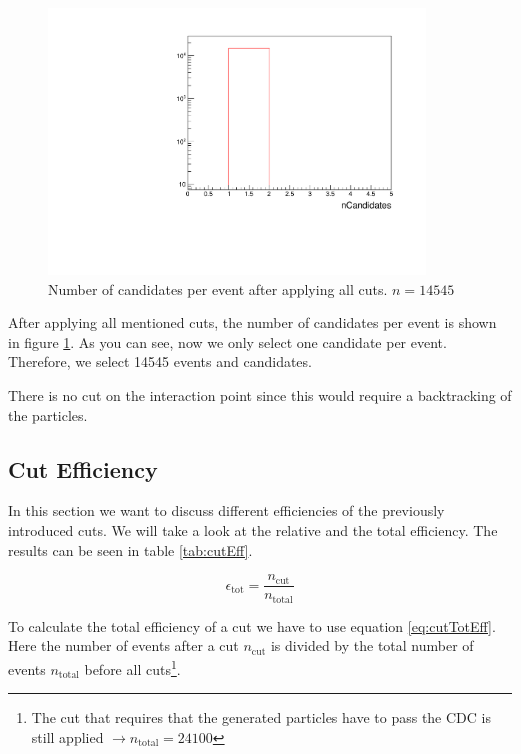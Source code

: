 \documentclass[a4paper,11pt,twosided,final,german,openbib,pdftex,listof=totoc,bibliography=totoc]{scrbook}
\begin{document}
\begin{figure}[h!]
	\centering
	\includegraphics[width=10cm]{Cuts/nCand.pdf}
	\caption[Number Of Candidates Per Event (All Cuts)]{Number of candidates per event after applying all cuts. $n = 14545$}	
	\label{fig:nCand}
\end{figure}

After applying all mentioned cuts, the number of candidates per event is shown in figure \ref{fig:nCand}. As you can see, now we only select one candidate per event. Therefore, we select 14545 events and candidates.

There is no cut on the interaction point since this would require a backtracking of the particles.




\subsection{Cut Efficiency}

In this section we want to discuss different efficiencies of the previously introduced cuts. We will take a look at the relative and the total efficiency. The results can be seen in table \ref{tab:cutEff}.

\begin{equation}
	\epsilon_{\textrm{tot}} = \frac{n_{\textrm{cut}}}{n_{\textrm{total}}}
	\label{eq:cutTotEff}
\end{equation}

To calculate the total efficiency of a cut we have to use equation \ref{eq:cutTotEff}. Here the number of events after a cut $n_{\textrm{cut}}$ is divided by the total number of events $n_{\textrm{total}}$ before all cuts\footnote{The cut that requires that the generated particles have to pass the CDC is still applied $\rightarrow n_{\textrm{total}} = 24100$}.
\end{document}

